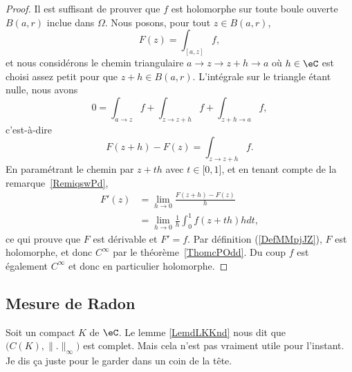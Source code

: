 \begin{proof}
	Il est suffisant de prouver que \( f\) est holomorphe sur toute boule ouverte \( B(a,r)\) inclue dans \( \Omega\). Nous posons, pour tout \( z\in B(a,r)\),
	\begin{equation}
		F(z)=\int_{[a,z]}f,
	\end{equation}
	et nous considérons le chemin triangulaire \( a\to z\to z+h\to a\) où \( h\in \eC\) est choisi assez petit pour que \( z+h\in B(a,r)\). L'intégrale sur le triangle étant nulle, nous avons
	\begin{equation}
		0=\int_{a\to z}f+\int_{z\to z+h}f+\int_{z+h\to a}f,
	\end{equation}
	c'est-à-dire
	\begin{equation}
		F(z+h)-F(z)=\int_{z\to z+h}f.
	\end{equation}
	En paramétrant le chemin par \( z+th\) avec \( t\in\mathopen[ 0 , 1 \mathclose]\), et en tenant compte de la remarque~\ref{RemiqswPd},
	\begin{subequations}
		\begin{align}
			F'(z) & =\lim_{h\to 0} \frac{ F(z+h)-F(z) }{ h }        \\
			      & =\lim_{h\to 0} \frac{1}{ h }\int_0^1f(z+th)hdt,
		\end{align}
	\end{subequations}
	ce qui prouve que \( F\) est dérivable et \( F'=f\). Par définition (\ref{DefMMpjJZ}), \( F\) est holomorphe, et donc \( C^{\infty}\) par le théorème~\ref{ThomcPOdd}. Du coup \( f\) est également \(  C^{\infty}\) et donc en particulier holomorphe.
\end{proof}

\subsection{Mesure de Radon}

Soit un compact \( K\) de \( \eC\).  Le lemme \ref{LemdLKKnd} nous dit que \( \big( C(K),\| . \|_{\infty} \big) \) est complet. Mais cela n'est pas vraiment utile pour l'instant. Je dis ça juste pour le garder dans un coin de la tête.

